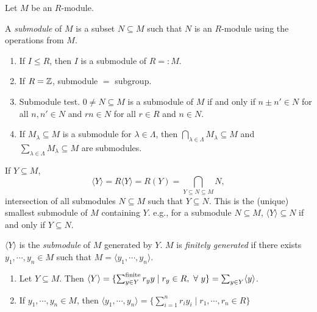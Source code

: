 \noindent Let $M$ be an $R$-module. 

\begin{definition}
    A \emph{submodule} of $M$ is a subset $N \subseteq M$ such that $N$ is an $R$-module using the operations from $M$.
\end{definition}

\begin{example}
    \begin{enumerate}
        \item If $I \leq R$, then $I$ is a submodule of $R =: M$.
        \item If $R = \mathbb{Z}$, submodule $=$ subgroup.
        \item Submodule test. $0 \neq N \subseteq M$ is a submodule of $M$ if and only if $n \pm n' \in N$ for all $n,n' \in N$ and $rn \in N$ for all $r \in R$ and $n \in N$.
        \item If $M_\lambda \subseteq M$ is a submodule for $\lambda \in \Lambda$, then $\bigcap_{\lambda \in \Lambda} M_\lambda \subseteq M$ and $\sum_{\lambda \in \Lambda} M_\lambda \subseteq M$ are submodules.
    \end{enumerate}
\end{example}

\begin{definition}
    If $Y \subseteq M$, 
    \[\langle Y \rangle = R\langle Y \rangle = R(Y) = \bigcap_{Y \subseteq N \subseteq M}N,\]
    intersection of all submodules $N \subseteq M$ such that $Y \subseteq N$. This is the (unique) smallest submodule of $M$ containing $Y$. e.g., for a submodule $N \subseteq M$, $\langle Y \rangle \subseteq N$ if and only if $Y \subseteq N$. \par
    $\langle Y \rangle$ is the \emph{submodule} of $M$ generated by $Y$. $M$ is \emph{finitely generated} if there exists $y_1,\cdots,y_n \in M$ such that $M = \langle y_1,\cdots,y_n \rangle$. 
\end{definition}

\begin{fact}
    \begin{enumerate}
        \item Let $Y \subseteq M$. Then $\langle Y \rangle = \{\sum_{y \in Y}^{\text{finite}} r_yy \mid r_y \in R, \ \forall \  y\} = \sum_{y \in Y} \langle y \rangle$.
        \item If $y_1,\cdots,y_n \in M$, then $\langle y_1,\cdots,y_n \rangle = \{\sum_{i=1}^{n} r_iy_i \mid r_1,\cdots,r_n \in R\}$
    \end{enumerate}
\end{fact}

